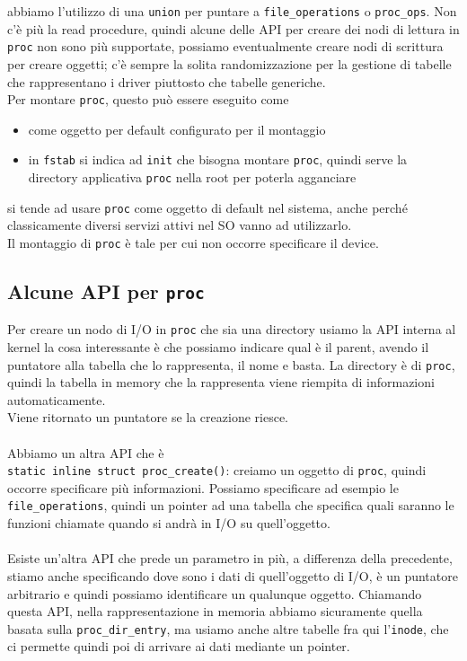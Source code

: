 \documentclass[12pt, oneside]{extbook}
\begin{document}
abbiamo l'utilizzo di una \texttt{union} per puntare a \texttt{file\_operations} o \texttt{proc\_ops}. Non c'è più la read procedure, quindi alcune delle API per creare dei nodi di lettura in \texttt{proc} non sono più supportate, possiamo eventualmente creare nodi di scrittura per creare oggetti; c'è sempre la solita randomizzazione per la gestione di tabelle che rappresentano i driver piuttosto che tabelle generiche.\\Per montare \texttt{proc}, questo può essere eseguito come
\begin{itemize}
	\item come oggetto per default configurato per il montaggio
	\item in \texttt{fstab} si indica ad \texttt{init} che bisogna montare \texttt{proc}, quindi serve la directory applicativa \texttt{proc} nella root per poterla agganciare
\end{itemize}
si tende  ad usare \texttt{proc} come oggetto di default nel sistema, anche perché classicamente diversi servizi attivi nel SO vanno ad utilizzarlo.\\Il montaggio di \texttt{proc} è tale per cui non occorre specificare il device.
\subsection{Alcune API per \texttt{proc}}
Per creare un nodo di I/O in \texttt{proc} che sia una directory usiamo la API interna al kernel %
la cosa interessante è che possiamo indicare qual è il parent, avendo il puntatore alla tabella che lo rappresenta, il nome e basta. La directory è di \texttt{proc}, quindi la tabella in memory che la rappresenta viene riempita di informazioni automaticamente.\\Viene ritornato un puntatore se la creazione riesce.\\\\Abbiamo un altra API che è\\ \texttt{static inline struct proc\_create()}: creiamo un oggetto di \texttt{proc}, quindi occorre specificare più informazioni. Possiamo specificare ad esempio le \texttt{file\_operations}, quindi un pointer ad una tabella che specifica quali saranno le funzioni chiamate quando si andrà in I/O su quell'oggetto.\\\\Esiste un'altra API che prede un parametro in più, a differenza della precedente, stiamo anche specificando dove sono i dati di quell'oggetto di I/O, è un puntatore arbitrario e quindi possiamo identificare un qualunque oggetto. Chiamando questa API, nella rappresentazione in memoria abbiamo sicuramente quella basata sulla \texttt{proc\_dir\_entry}, ma usiamo anche altre tabelle fra qui l'\texttt{inode}, che ci permette quindi poi di arrivare ai dati mediante un pointer.
\end{document}
